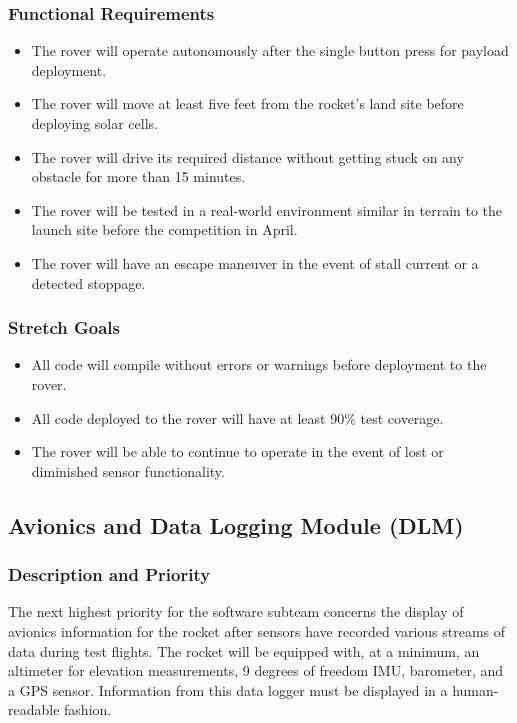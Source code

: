 \documentclass[onecolumn, draftclsnofoot, 10pt, compsoc]{IEEEtran}
\begin{document}
\subsubsection{Functional Requirements}
\begin{itemize}
\item The rover will operate autonomously after the single button press for payload deployment.
\item The rover will move at least five feet from the rocket's land site before deploying solar cells.
\item The rover will drive its required distance without getting stuck on any obstacle for more than 15 minutes.
\item The rover will be tested in a real-world environment similar in terrain to the launch site before the competition in April.
\item The rover will have an escape maneuver in the event of stall current or a detected stoppage.
\end{itemize}

\subsubsection{Stretch Goals}
\begin{itemize}
\item All code will compile without errors or warnings before deployment to the rover.
\item All code deployed to the rover will have at least 90\% test coverage.
\item The rover will be able to continue to operate in the event of lost or diminished sensor functionality.
\end{itemize}


\subsection{Avionics and Data Logging Module (DLM)}
\subsubsection{Description and Priority}
The next highest priority for the software subteam concerns the display of avionics information for the rocket after sensors have recorded various streams of data during test flights.
The rocket will be equipped with, at a minimum, an altimeter for elevation measurements, 9 degrees of freedom IMU, barometer, and a GPS sensor. Information from this data logger must be displayed in a human-readable fashion. 
\end{document}
